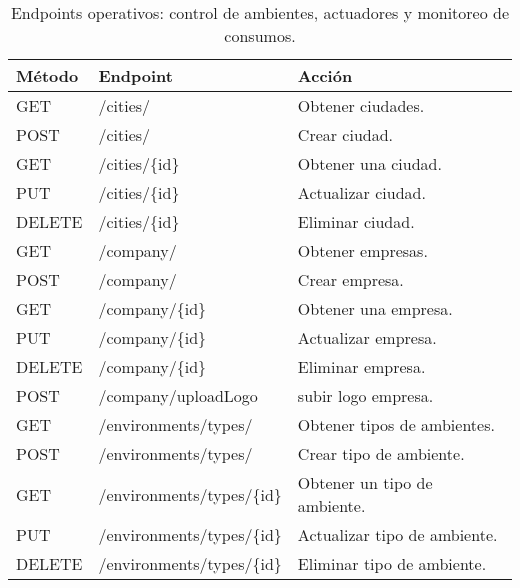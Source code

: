 \begin{table}[H]
    \centering
    \caption[Endpoints de operación]{Endpoints operativos: control de ambientes, actuadores y monitoreo de consumos.}  
    \begin{tabular}{l l l}
        \toprule
        \textbf{Método} & \textbf{Endpoint}                & \textbf{Acción}               \\
        \midrule
        GET             & /cities/                         & Obtener ciudades.             \\
        POST            & /cities/                         & Crear ciudad.                 \\
        GET             & /cities/\{id\}                   & Obtener una ciudad.           \\
        PUT             & /cities/\{id\}                   & Actualizar ciudad.            \\
        DELETE          & /cities/\{id\}                   & Eliminar ciudad.              \\
        \midrule
        GET             & /company/                        & Obtener empresas.             \\
        POST            & /company/                        & Crear empresa.                \\
        GET             & /company/\{id\}                  & Obtener una empresa.          \\
        PUT             & /company/\{id\}                  & Actualizar empresa.           \\
        DELETE          & /company/\{id\}                  & Eliminar empresa.             \\
        POST            & /company/uploadLogo              & subir logo empresa.           \\
        \midrule
        GET             & /environments/types/             & Obtener tipos de ambientes.   \\
        POST            & /environments/types/             & Crear tipo de ambiente.       \\
        GET             & /environments/types/\{id\}       & Obtener un tipo de ambiente.  \\
        PUT             & /environments/types/\{id\}       & Actualizar tipo de ambiente.  \\
        DELETE          & /environments/types/\{id\}       & Eliminar tipo de ambiente.    \\

\end{tabular}
\end{table}
